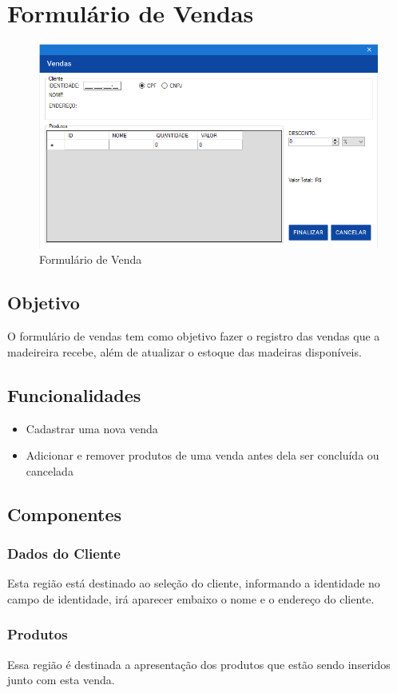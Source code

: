 \documentclass[
	article,			%
	12pt,				%
	oneside,			%
	a4paper,			%
	english,			%
	brazil,				%
	sumario=tradicional
	]{abntex2}
\begin{document}
	\section{Formulário de Vendas}
		\begin{figure}[!htb]
			\centering
			\includegraphics[scale=0.7]{./Figuras/FrmVenda.png}
			\caption{Formulário de Venda}
		\end{figure}
		\subsection{Objetivo}
		O formulário de vendas tem como objetivo fazer o registro das vendas que a madeireira recebe, além de atualizar o estoque das madeiras disponíveis.  
		\subsection{Funcionalidades}
			\begin{itemize}
				\item Cadastrar uma nova venda
				\item Adicionar e remover produtos de uma venda antes dela ser concluída ou cancelada
			\end{itemize}
		\subsection{Componentes}
			\subsubsection{Dados do Cliente}
			Esta região está destinado ao seleção do cliente, informando a identidade no campo de identidade, irá aparecer embaixo o nome e o endereço do cliente.
			\subsubsection{Produtos}
			Essa região é destinada a apresentação dos produtos que estão sendo inseridos junto com esta venda.
\end{document}

